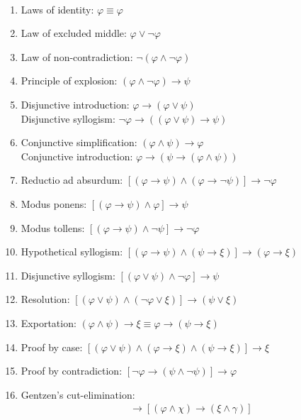 \documentclass{treatise}
\begin{document}
\begin{proposition} \label{logic-propositional-laws} \ 
\begin{enumerate}
    \item Laws of identity: $\varphi \equiv \varphi$
    \item Law of excluded middle: $\varphi \vee \neg \varphi$
    \item Law of non-contradiction: $\neg(\varphi \wedge \neg \varphi)$
    \item Principle of explosion: $(\varphi \wedge \neg \varphi) \to \psi$
    \item Disjunctive introduction: $\varphi \to (\varphi \vee \psi)$
    \\
    Disjunctive syllogism: $\neg\varphi \to ((\varphi \vee \psi) \to \psi)$
    \item Conjunctive simplification: $(\varphi \wedge \psi) \to \varphi$
    \\
    Conjunctive introduction: $\varphi \to (\psi \to (\varphi \wedge \psi))$
    \item Reductio ad absurdum: $[(\varphi \to \psi) \wedge (\varphi \to \neg \psi)] \to \neg \varphi$
    \item Modus ponens: $[(\varphi \to \psi) \wedge \varphi] \to \psi$
    \item Modus tollens: $[(\varphi \to \psi) \wedge \neg \psi] \to \neg \varphi$
    \item Hypothetical syllogism: $[(\varphi \to \psi) \wedge (\psi \to \xi)] \to (\varphi \to \xi)$
    \item Disjunctive syllogism: $[(\varphi \vee \psi) \wedge \neg \varphi] \to \psi$
    \item Resolution: $[(\varphi \vee \psi) \wedge (\neg \varphi \vee \xi)] \to (\psi \vee \xi)$
    \item Exportation: $(\varphi \wedge \psi) \to \xi \equiv \varphi \to (\psi \to \xi)$
    \item Proof by case: $[(\varphi \vee \psi) \wedge (\varphi \to \xi) \wedge (\psi \to \xi)] \to \xi$
    \item Proof by contradiction: $[\neg \varphi \to (\psi \wedge \neg \psi)] \to \varphi$
    \item Gentzen's cut-elimination:
    \begin{align*}
        [(\varphi \to (\psi \wedge \xi)) \wedge ((\psi \wedge \chi) \to \gamma)] \to [(\varphi \wedge \chi) \to (\xi \wedge \gamma)]
    \end{align*}
\end{enumerate}
\end{proposition}
\end{document}
